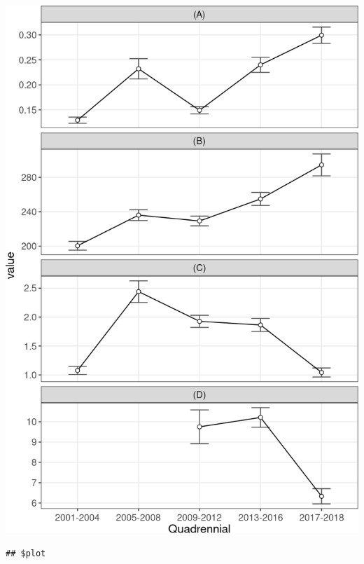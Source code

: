 \documentclass[10pt,landscape,a3paper]{article}
\begin{document}
\begin{center}\includegraphics{img/modelling/aa-eda-ts-11} \end{center}

\begin{verbatim}
## $plot
\end{verbatim}
\end{document}
